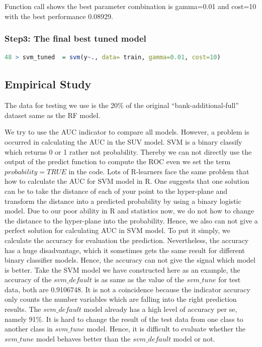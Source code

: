 \documentclass[12pt, a4paper, bibliography=totoc, english]{scrartcl}
\begin{document}
Function call shows the best parameter combination is gamma=0.01 and cost=10 with the best performance 0.08929. 


\subsubsection{Step3: The final best tuned model}
\begin{lstlisting}[language = R]
48 > svm_tuned  = svm(y~., data= train, gamma=0.01, cost=10) 
\end{lstlisting}

\subsection{Empirical Study}
The data for testing we use is the 20\% of the original ``bank-additional-full'' dataset same as the RF model.

We try to use the AUC indicator to compare all models. However, a problem is occurred in calculating the AUC in the SUV model. SVM is a binary classify which returns 0 or 1 rather not probability. Thereby we can not directly use the output of the predict function to compute the ROC even we set the term $probability=TRUE$ in the code. Lots of R-learners face the same problem that how to calculate the AUC for SVM model in R. One suggests that one solution can be to take the distance of each of your point to the hyper-plane and transform the distance into a predicted probability by using a binary logistic model.  Due to our poor ability in R and statistics now, we do not how to change the distance to the hyper-plane into the probability. Hence, we also can not give a perfect solution for calculating AUC in SVM model. To put it simply, we calculate the accuracy for evaluation the prediction. Nevertheless, the accuracy has a huge disadvantage, which it sometimes gets the same result for different binary classifier models. Hence, the accuracy can not give the signal which model is better.  Take the SVM model we have constructed here as an example, the accuracy of the $svm\_default$ is as same as the value of the $svm\_tune$ for test data, both are 0.9106748. It is not a coincidence because the indicator accuracy only counts the number variables which are falling into the right prediction results. The $svm\_default$ model already has a high level of accuracy per se, namely 91\%. It is hard to change the result of the test data from one class to another class in $svm\_tune$ model. Hence, it is difficult to evaluate whether the $svm\_tune$ model behaves better than the $svm\_default$ model or not.\\
\end{document}
